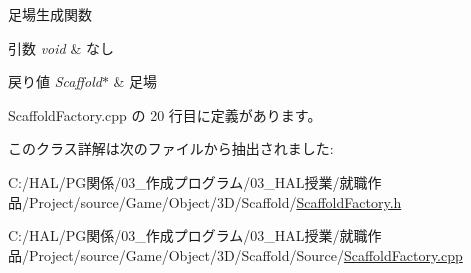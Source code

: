 足場生成関数 


\begin{DoxyParams}{引数}
{\em void} & なし \\
\hline
\end{DoxyParams}

\begin{DoxyRetVals}{戻り値}
{\em Scaffold$\ast$} & 足場 \\
\hline
\end{DoxyRetVals}


 Scaffold\+Factory.\+cpp の 20 行目に定義があります。



このクラス詳解は次のファイルから抽出されました\+:\begin{DoxyCompactItemize}
\item 
C\+:/\+H\+A\+L/\+P\+G関係/03\+\_\+作成プログラム/03\+\_\+\+H\+A\+L授業/就職作品/\+Project/source/\+Game/\+Object/3\+D/\+Scaffold/\mbox{\hyperlink{_scaffold_factory_8h}{Scaffold\+Factory.\+h}}\item 
C\+:/\+H\+A\+L/\+P\+G関係/03\+\_\+作成プログラム/03\+\_\+\+H\+A\+L授業/就職作品/\+Project/source/\+Game/\+Object/3\+D/\+Scaffold/\+Source/\mbox{\hyperlink{_scaffold_factory_8cpp}{Scaffold\+Factory.\+cpp}}\end{DoxyCompactItemize}
